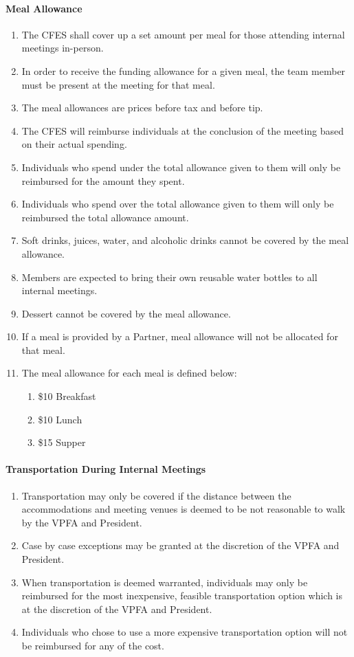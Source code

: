 \paragraph{Meal Allowance}
\begin{enumerate}
 \item
  The CFES shall cover up a set amount per meal for those attending internal meetings in-person.
 \item
  In order to receive the funding allowance for a given meal, the team member must be present at the meeting for that meal.
 \item
  The meal allowances are prices before tax and before tip.
 \item
  The CFES will reimburse individuals at the conclusion of the meeting based on their actual spending.
 \item
  Individuals who spend under the total allowance given to them will only be reimbursed for the amount they spent.
 \item
  Individuals who spend over the total allowance given to them will only be reimbursed the total allowance amount.
 \item
  Soft drinks, juices, water, and alcoholic drinks cannot be covered by the meal allowance.
 \item
  Members are expected to bring their own reusable water bottles to all internal meetings.
 \item
  Dessert cannot be covered by the meal allowance.
 \item
  If a meal is provided by a Partner, meal allowance will not be allocated for that meal.
 \item
  The meal allowance for each meal is defined below:

  \begin{enumerate}
   \item
    \$10 Breakfast
   \item
    \$10 Lunch
   \item
    \$15 Supper
  \end{enumerate}

\end{enumerate}

\paragraph{Transportation During Internal Meetings}
\begin{enumerate}
 \item
  Transportation may only be covered if the distance between the accommodations and meeting venues is deemed to be not reasonable to walk by the VPFA and President.
 \item
  Case by case exceptions may be granted at the discretion of the VPFA and President.
 \item
  When transportation is deemed warranted, individuals may only be reimbursed for the most inexpensive, feasible transportation option which is at the discretion of the VPFA and President.
 \item
  Individuals who chose to use a more expensive transportation option will not be reimbursed for any of the cost.
\end{enumerate}

